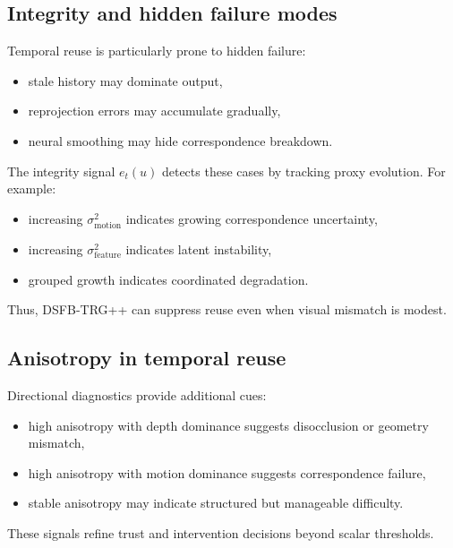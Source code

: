 \documentclass[11pt]{article}
\theoremstyle{definition}
\theoremstyle{plain}
\begin{document}

\subsection{Integrity and hidden failure modes}

Temporal reuse is particularly prone to hidden failure:
\begin{itemize}[leftmargin=1.5em]
    \item stale history may dominate output,
    \item reprojection errors may accumulate gradually,
    \item neural smoothing may hide correspondence breakdown.
\end{itemize}

The integrity signal $e_t(u)$ detects these cases by tracking proxy evolution. For example:
\begin{itemize}[leftmargin=1.5em]
    \item increasing $\sigma^{2}_{\mathrm{motion}}$ indicates growing correspondence uncertainty,
    \item increasing $\sigma^{2}_{\mathrm{feature}}$ indicates latent instability,
    \item grouped growth indicates coordinated degradation.
\end{itemize}

Thus, DSFB-TRG++ can suppress reuse even when visual mismatch is modest.


\subsection{Anisotropy in temporal reuse}

Directional diagnostics provide additional cues:
\begin{itemize}[leftmargin=1.5em]
    \item high anisotropy with depth dominance suggests disocclusion or geometry mismatch,
    \item high anisotropy with motion dominance suggests correspondence failure,
    \item stable anisotropy may indicate structured but manageable difficulty.
\end{itemize}

These signals refine trust and intervention decisions beyond scalar thresholds.
\end{document}
